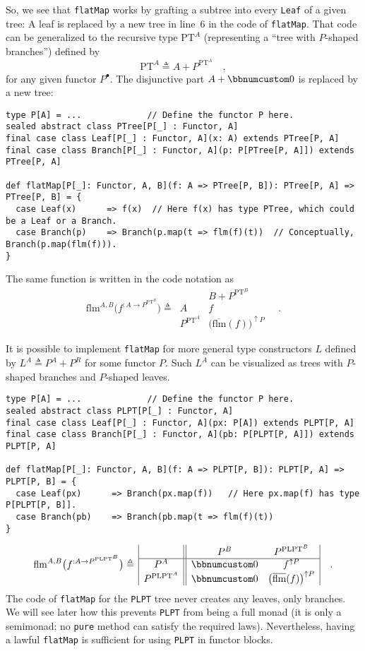 So, we see that \lstinline!flatMap! works by grafting a subtree into
every \lstinline!Leaf! of a given tree: A leaf is replaced by a new
tree in line~6 in the code of \lstinline!flatMap!. That code can
be generalized to the recursive type $\text{PT}^{A}$ (representing
a \textsf{``}tree with $P$-shaped branches\textsf{''}) defined by
\[
\text{PT}^{A}\triangleq A+P^{\text{PT}^{A}}\quad,
\]
for any given functor $P^{\bullet}$. The disjunctive part $A+\bbnum 0$
is replaced by a new tree:
\begin{lstlisting}
type P[A] = ...             // Define the functor P here.
sealed abstract class PTree[P[_] : Functor, A]
final case class Leaf[P[_] : Functor, A](x: A) extends PTree[P, A]
final case class Branch[P[_] : Functor, A](p: P[PTree[P, A]]) extends PTree[P, A]

def flatMap[P[_]: Functor, A, B](f: A => PTree[P, B]): PTree[P, A] => PTree[P, B] = {
  case Leaf(x)      => f(x)  // Here f(x) has type PTree, which could be a Leaf or a Branch.
  case Branch(p)    => Branch(p.map(t => flm(f)(t))  // Conceptually, Branch(p.map(flm(f))). 
}
\end{lstlisting}
The same function is written in the code notation as
\[
\text{flm}^{A,B}\big(f^{:A\rightarrow P^{\text{PT}^{B}}}\big)\triangleq\,\begin{array}{|c||c|}
 & B+P^{\text{PT}^{B}}\\
\hline A & f\\
P^{\text{PT}^{A}} & \big(\overline{\text{flm}}(f)\big)^{\uparrow P}
\end{array}\quad.
\]

It is possible to implement \lstinline!flatMap! for more general
type constructors $L$ defined by $L^{A}\triangleq P^{A}+P^{R}$ for
some functor $P$. Such $L^{A}$ can be visualized as trees with $P$-shaped
branches and $P$-shaped leaves.
\begin{lstlisting}
type P[A] = ...             // Define the functor P here.
sealed abstract class PLPT[P[_] : Functor, A]
final case class Leaf[P[_] : Functor, A](px: P[A]) extends PLPT[P, A]
final case class Branch[P[_] : Functor, A](pb: P[PLPT[P, A]]) extends PLPT[P, A]

def flatMap[P[_]: Functor, A, B](f: A => PLPT[P, B]): PLPT[P, A] => PLPT[P, B] = {
  case Leaf(px)      => Branch(px.map(f))   // Here px.map(f) has type P[PLPT[P, B]].
  case Branch(pb)    => Branch(pb.map(t => flm(f)(t))
}
\end{lstlisting}
\[
\text{flm}^{A,B}\big(f^{:A\rightarrow P^{\text{PLPT}^{B}}}\big)\triangleq\,\begin{array}{|c||cc|}
 & P^{B} & P^{\text{PLPT}^{B}}\\
\hline P^{A} & \bbnum 0 & f^{\uparrow P}\\
P^{\text{PLPT}^{A}} & \bbnum 0 & \big(\overline{\text{flm}}(f)\big)^{\uparrow P}
\end{array}\quad.
\]
The code of \lstinline!flatMap! for the \lstinline!PLPT! tree never
creates any leaves, only branches. We will see later how this prevents
\lstinline!PLPT! from being a full monad (it is only a semimonad;
no \lstinline!pure! method can satisfy the required laws). Nevertheless,
having a lawful \lstinline!flatMap! is sufficient for using \lstinline!PLPT!
in functor blocks.

